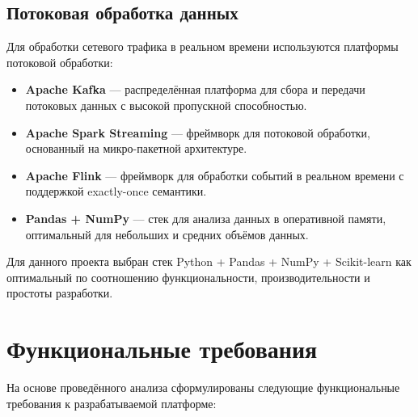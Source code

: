 \subsection{Потоковая обработка данных}

Для обработки сетевого трафика в реальном времени используются платформы потоковой обработки:

\begin{itemize}
    \item \textbf{Apache Kafka} — распределённая платформа для сбора и передачи потоковых данных с высокой пропускной способностью.
    \item \textbf{Apache Spark Streaming} — фреймворк для потоковой обработки, основанный на микро-пакетной архитектуре.
    \item \textbf{Apache Flink} — фреймворк для обработки событий в реальном времени с поддержкой exactly-once семантики.
    \item \textbf{Pandas + NumPy} — стек для анализа данных в оперативной памяти, оптимальный для небольших и средних объёмов данных.
\end{itemize}

Для данного проекта выбран стек Python + Pandas + NumPy + Scikit-learn как оптимальный по соотношению функциональности, производительности и простоты разработки.

\section{Функциональные требования}

На основе проведённого анализа сформулированы следующие функциональные требования к разрабатываемой платформе:

